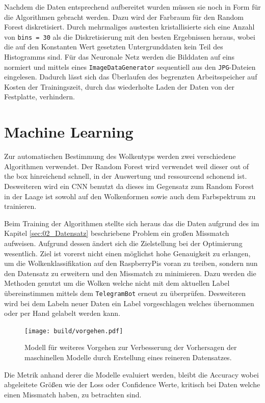Nachdem die Daten entsprechend aufbereitet wurden müssen sie noch in Form für
die Algorithmen gebracht werden. 
Dazu wird der Farbraum für den Random Forest diskretisiert.
Durch mehrmaliges austesten kristallisierte sich eine Anzahl von 
\texttt{bins = 30} als die Diskretisierung mit den besten Ergebnissen heraus,
wobei die auf den Konstanten Wert gesetzten Untergrunddaten kein Teil des
Histogramms sind.
Für das Neuronale Netz werden die Bilddaten auf eins normiert und mittels 
eines \texttt{ImageDataGenerator} sequentiell aus den \texttt{JPG}-Dateien 
eingelesen. 
Dadurch lässt sich das Überlaufen des begrenzten Arbeitsspeicher auf Kosten 
der Trainingszeit, durch das wiederholte Laden der Daten von der Festplatte,
verhindern.


\section{Machine Learning}

Zur automatischen Bestimmung des Wolkentyps werden zwei verschiedene 
Algorithmen verwendet. 
Der Random Forest wird verwendet weil dieser out of the box hinreichend 
schnell, in der Auswertung und ressourcend schonend ist.
Desweiteren wird ein CNN benutzt da dieses im Gegensatz zum Random Forest in 
der Laage ist sowohl auf den Wolkenformen sowie auch dem Farbspektrum zu
trainieren. 

Beim Training der Algorithmen stellte sich heraus das die Daten aufgrund des im
Kapitel \ref{sec:02_Datensatz} beschriebene Problem ein großen Missmatch 
aufweisen. 
Aufgrund dessen ändert sich die Zielstellung bei der Optimierung wesentlich.
Ziel ist vorerst nicht einen möglichst hohe Genauigkeit zu erlangen,
um die Wolkenklassifikation auf den RaspberryPis voran zu treiben,
sondern nun den Datensatz zu erweitern und den Missmatch zu 
minimieren.
Dazu werden die Methoden genutzt um die Wolken welche nicht mit dem 
aktuellen Label übereinstimmen mittels dem \texttt{TelegramBot} erneut zu überprüfen.
Desweiteren wird bei dem Labeln neuer Daten ein Label vorgeschlagen
welches übernommen oder per Hand gelabelt werden kann.
\begin{figure}
		\centering
		\texttt{[image: build/vorgehen.pdf]}
		\caption{Modell für weiteres Vorgehen zur Verbesserung der Vorhersagen
		der maschinellen Modelle durch Erstellung eines reineren Datensatzes.}
		\label{fig:}
\end{figure}

Die Metrik anhand derer die Modelle evaluiert werden, bleibt die 
Accuracy wobei abgeleitete Größen wie der Loss oder Confidence 
Werte, kritisch bei Daten welche einen Missmatch haben, zu 
betrachten sind.

